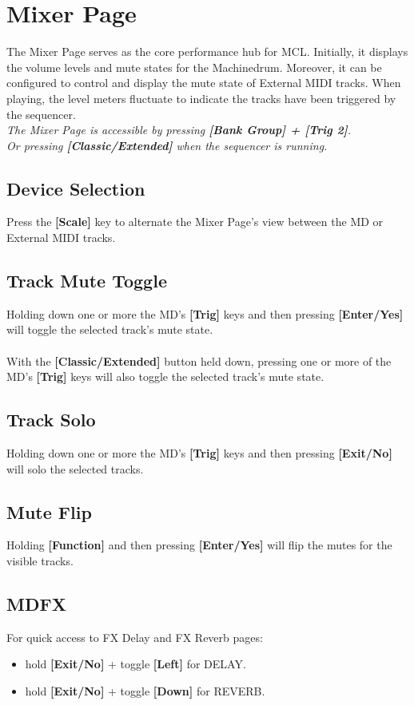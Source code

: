 \chapter{Mixer Page}
The Mixer Page serves as the core performance hub for MCL. Initially, it displays the volume levels and mute states for the Machinedrum. Moreover, it can be configured to control and display the mute state of External MIDI tracks. When playing, the level meters fluctuate to indicate the tracks have been triggered by the sequencer.
\\
\textit{The Mixer Page is accessible by pressing \textbf{[Bank Group] + [Trig 2]}.\\Or pressing \textbf{[Classic/Extended]} when the sequencer is running.}

\section{Device Selection}
Press the \textbf{[Scale]} key to alternate the Mixer Page's view between the MD or External MIDI tracks.
\newpage
\section{Track Mute Toggle}
Holding down one or more the MD's \textbf{[Trig]} keys and then pressing \textbf{[Enter/Yes]} will toggle the selected track's mute state.\\\\
With the \textbf{[Classic/Extended]} button held down, pressing one or more of the MD's \textbf{[Trig]} keys will also toggle the selected track's mute state.
\section{Track Solo}
Holding down one or more the MD's \textbf{[Trig]} keys and then pressing \textbf{[Exit/No]} will solo the selected tracks.
\section{Mute Flip}
Holding \textbf{[Function]} and then pressing \textbf{[Enter/Yes]} will flip the mutes for the visible tracks.
\section{MDFX}
For quick access to FX Delay and FX Reverb pages:
\begin{itemize}
    \item hold \textbf{[Exit/No]} + toggle \textbf{[Left]} for DELAY.
    \item hold \textbf{[Exit/No]} + toggle \textbf{[Down]} for REVERB.
\end{itemize}

